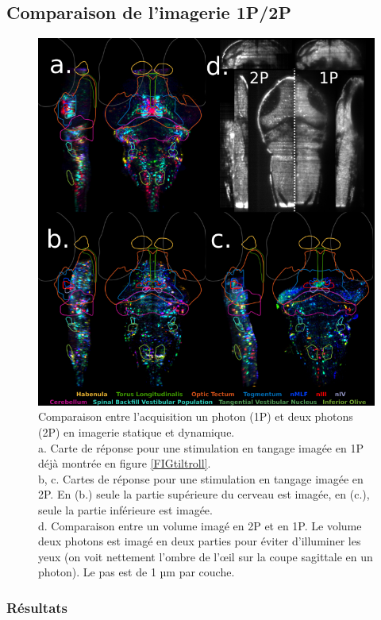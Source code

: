 \subsection{Comparaison de l'imagerie 1P/2P}

\begin{figure}
    \centering
    \includegraphics[width=\textwidth]{./files/1P-2P.svg.png}
    \caption{Comparaison entre l'acquisition un photon (1P) et deux photons (2P) en imagerie statique et dynamique.
    \\ a. Carte de réponse pour une stimulation en tangage imagée en 1P déjà montrée en figure \ref{FIGtiltroll}.
    \\ b, c. Cartes de réponse pour une stimulation en tangage imagée en 2P. En (b.) seule la partie supérieure du cerveau est imagée, en (c.), seule la partie inférieure est imagée.
    \\ d. Comparaison entre un volume imagé en 2P et en 1P. Le volume deux photons est imagé en deux parties pour éviter d'illuminer les yeux (on voit nettement l'ombre de l'œil sur la coupe sagittale en un photon). Le pas est de 1 µm par couche.
    \label{FIG1P2P}}
    \end{figure}

\subsubsection{Résultats}

